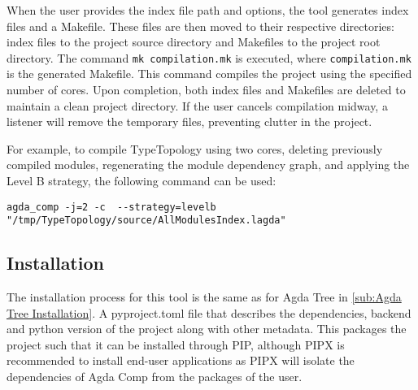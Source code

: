 When the user provides the index file path and options, the tool
generates index files and a Makefile. These files are then moved to their
respective directories: index files to the project source directory and
Makefiles to the project root directory. The command \texttt{mk compilation.mk} is
executed, where \texttt{compilation.mk} is the generated Makefile. This command
compiles the project using the specified number of cores. Upon completion, both
index files and Makefiles are deleted to maintain a clean project directory. If
the user cancels compilation midway, a listener will remove the temporary
files, preventing clutter in the project.


For example, to compile TypeTopology using two cores, deleting previously
compiled modules, regenerating the module dependency graph, and applying the
Level B strategy, the following command can be used:

\noindent
\begin{minipage}{\textwidth}
\begin{lstlisting}
agda_comp -j=2 -c  --strategy=levelb "/tmp/TypeTopology/source/AllModulesIndex.lagda"
\end{lstlisting}
\end{minipage}

\subsection{Installation}

The installation process for this tool is the same as for Agda Tree in 
\cref{sub:Agda Tree Installation}. A pyproject.toml file that describes
the dependencies, backend and python version of the project along with
other metadata. This packages the project such that it can be installed through
PIP, although PIPX is recommended to install end-user applications as PIPX will
isolate the dependencies of Agda Comp from the packages of the user.

